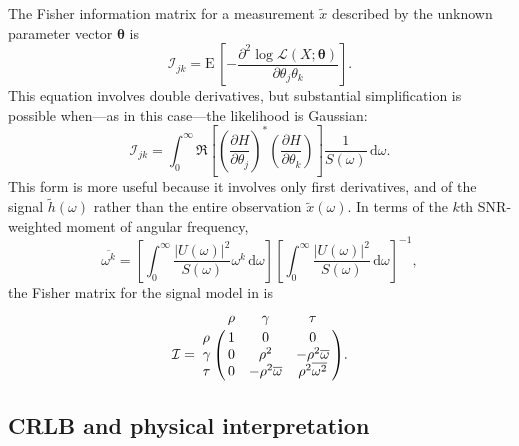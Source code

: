 \documentclass{iopart}
\begin{document}
The Fisher information matrix for a measurement $\tilde x$ described by the unknown parameter vector $\boldsymbol{\theta}$ is
%
\begin{equation}\label{eq:general-fisher-matrix}
	\mathcal{I}_{jk} = \mathrm{E} \, \left[
		-\frac{\partial^2 \log
			\mathcal{L}(X ; \boldsymbol\theta)}
			{\partial \theta_j \theta_k}
	\right].
\end{equation}
%
This equation involves double derivatives, but substantial simplification is possible when---as in this case---the likelihood is Gaussian:
%
\begin{equation}\label{eq:gaussian-fisher-matrix}
	\mathcal{I}_{jk} = \int_0^\infty \Re \left[
        \left(\frac{\partial H}{\partial \theta_j}\right)^*
        \left(\frac{\partial H}{\partial \theta_k}\right)
	\right] \frac{1}{S(\omega)} \, \mathrm{d}\omega.
\end{equation}
%
This form is more useful because it involves only first derivatives, and of the signal $\tilde h (\omega)$ rather than the entire observation $\tilde x (\omega)$. In terms of the $k$th \ac{SNR}-weighted moment of angular frequency,
%
\begin{equation}\label{eq:angular-frequency-moments}
    \overline{\omega^k} =
        \left[ \int_0^\infty \frac{|U (\omega)|^2}{S(\omega)} \omega^k \, \mathrm{d}\omega \right]
        \left[ \int_0^\infty \frac{|U (\omega)|^2}{S(\omega)} \, \mathrm{d}\omega \right]^{-1},
\end{equation}
%
the Fisher matrix for the signal model in  is
%
\begin{equation}\label{eq:fisher-matrix}
	\mathcal{I} = \bordermatrix{
        ~ & \rho & \gamma & \tau \cr
        \rho & 1 & 0 & 0 \cr
        \gamma & 0 & \rho^2 & -\rho^2 \overline{\omega} \cr
        \tau & 0 & -\rho^2 \overline{\omega} & \rho^2 \overline{\omega^2}
    }.
\end{equation}

\subsection{\ac{CRLB} and physical interpretation}
\end{document}
